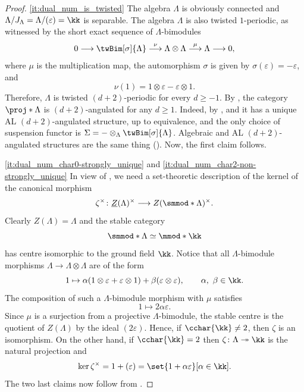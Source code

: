 \documentclass[a4paper]{amsart}
\begin{document}
\begin{proof}
  \eqref{it:dual_num_is_twisted} The algebra $\Lambda$ is obviously connected and $\Lambda/J_\Lambda=\Lambda/(\varepsilon)=\kk$ is separable. The algebra $\Lambda$  is also twisted $1$-periodic, as witnessed by the short exact sequence
  of $\Lambda$-bimodules
  \[
    0\longrightarrow \twBim[\sigma]{\Lambda}\stackrel{\nu}{\longrightarrow}\Lambda\otimes\Lambda\stackrel{\mu}{\longrightarrow} \Lambda\longrightarrow 0,
  \]
  where $\mu$ is the multiplication map, the automorphism $\sigma$ is given by
  $\sigma(\varepsilon)=-\varepsilon$, and
  \[
    \nu(1)=1\otimes\varepsilon-\varepsilon\otimes 1.
  \]
  Therefore, $\Lambda$ is twisted $(d+2)$-periodic for every $d\geq -1$. By
  , the category $\proj*{\Lambda}$ is $(d+2)$-angulated for any $d\geq1$. Indeed, by ,  and  it has a unique AL $(d+2)$-angulated structure, up to equivalence, and the only choice of suspension functor is $\Sigma=-\otimes_\Lambda\twBim[\sigma]{\Lambda}$. Algebraic and AL $(d+2)$-angulated structures are the same thing (). Now, the first claim follows. 
  
  \eqref{it:dual_num_char0-strongly_unique} and
  \eqref{it:dual_num_char2-non-strongly_unique} 
  In view of , we need a set-theoretic description
  of the kernel of the canonical morphism
  \[
    \zeta^\times\colon\underline{Z}(\Lambda)^\times\longrightarrow Z(\smmod*{\Lambda})^\times.
  \]
  Clearly $Z(\Lambda)=\Lambda$ and the stable category
  \[
    \smmod*{\Lambda}\simeq\mmod*{\kk}
  \]
  has centre isomorphic to the ground field $\kk$. Notice that all
  $\Lambda$-bimodule morphisms $\Lambda\to\Lambda\otimes\Lambda$ are of the form
  \[
    1\mapsto \alpha(1\otimes\varepsilon+\varepsilon\otimes
    1)+\beta(\varepsilon\otimes\varepsilon),\qquad \alpha,\ \beta\in\kk.
  \]
  The composition of such a $\Lambda$-bimodule morphism with $\mu$ satisfies
  \[
    1\mapsto 2\alpha\varepsilon.
  \]
  Since $\mu$ is a surjection from a projective $\Lambda$-bimodule, the stable
  centre is the quotient of $Z(\Lambda)$ by the ideal $(2\varepsilon)$. Hence,
  if $\cchar{\kk}\neq 2$, then $\zeta$ is an isomorphism. On the other hand, if
  $\cchar{\kk}=2$ then $\zeta\colon\Lambda\twoheadrightarrow\kk$ is the natural
  projection and
  \[
    \ker\zeta^\times=1+(\varepsilon)=\set{1+\alpha\varepsilon}[\alpha\in\kk].
  \]
  The two last claims now follow from .
\end{proof}
\end{document}
